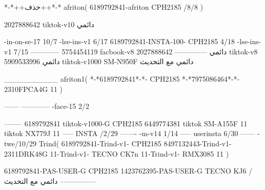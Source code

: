 *-*++حذف++*-*
afriton(
6189792841-afriton CPH2185  /8/8
)

2027888642 tiktok-v10
دائمي

-in-on-se-17 10/7
-lse-ins-v1 6/17
6189792841-INSTA-100- CPH2185 4/18
-lse-ins-v1 7/15
------------
5754454119 facbook-v8
دائمي
--------------
2027888642 tiktok-v8
دائمي
5909533996 tiktok-v1000  SM-N950F
دائمي مع التحديث

__________
afriton1(
*-*6189792841*-*- CPH2185
*-*7975086464*-*- 2310FPCA4G 11\6
)


------
------------
-face-15 2/2

--------
6189792841 tiktok-v1000-G CPH2185 
6449774381 tiktok   SM-A155F 11 tiktok   NX779J 11\6
-----
 INSTA /2/29
-------
-m-v14 1/14
-----
userinsta 6/30
------
-twe/10/29
Trind(
6189792841-Trind-v1- CPH2185 
8497132443-Trind-v1- 2311DRK48G 11-Trind-v1- TECNO CK7n 11-Trind-v1- RMX3085 11\1
)


6189792841-PAS-USER-G CPH2185 
1423762395-PAS-USER-G TECNO KJ6  /دائمي مع التحديث
    ---------------

